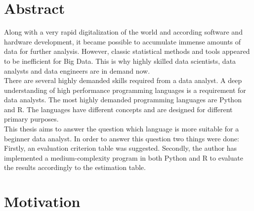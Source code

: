 \documentclass[
  twoside,
  11pt, a4paper,
  footinclude=true,
  headinclude=true,
  cleardoublepage=empty
]{scrreprt}
\begin{document}

    \chapter*{Abstract}
        \onehalfspace
        Along with a very rapid digitalization of the world and according software and hardware development, it became possible to accumulate immense amounts of data for further analysis. However, classic statistical methods and tools appeared to be inefficient for Big Data. This is why highly skilled data scientists, data analysts and data engineers are in demand now. \\
        There are several highly demanded skills required from a data analyst. A deep understanding of high performance programming languages is a requirement for data analysts. The most highly demanded programming languages are Python and R. The languages have different concepts and are designed for different primary purposes. \\
        This thesis aims to answer the question which language is more suitable for a beginner data analyst. In order to answer this question two things were done: Firstly, an evaluation criterion table was suggested. Secondly, the author has implemented a medium-complexity program in both Python and R to evaluate the results accordingly to the estimation table.
        \singlespace

\tableofcontents

    \chapter{Motivation}
\end{document}
